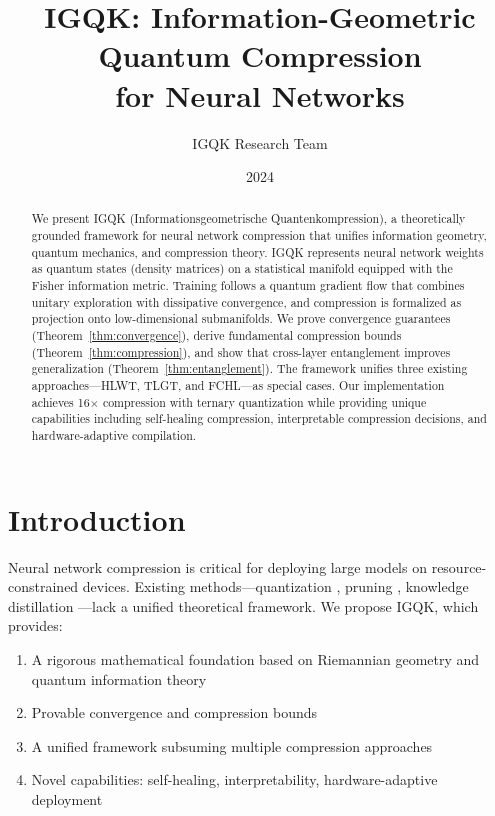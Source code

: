 \documentclass[11pt,a4paper]{article}
\title{IGQK: Information-Geometric Quantum Compression\\for Neural Networks}
\author{IGQK Research Team}
\date{2024}
\begin{document}
\maketitle

\begin{abstract}
We present IGQK (Informationsgeometrische Quantenkompression), a theoretically grounded framework for neural network compression that unifies information geometry, quantum mechanics, and compression theory. IGQK represents neural network weights as quantum states (density matrices) on a statistical manifold equipped with the Fisher information metric. Training follows a quantum gradient flow that combines unitary exploration with dissipative convergence, and compression is formalized as projection onto low-dimensional submanifolds. We prove convergence guarantees (Theorem~\ref{thm:convergence}), derive fundamental compression bounds (Theorem~\ref{thm:compression}), and show that cross-layer entanglement improves generalization (Theorem~\ref{thm:entanglement}). The framework unifies three existing approaches---HLWT, TLGT, and FCHL---as special cases. Our implementation achieves 16$\times$ compression with ternary quantization while providing unique capabilities including self-healing compression, interpretable compression decisions, and hardware-adaptive compilation.
\end{abstract}

\section{Introduction}

Neural network compression is critical for deploying large models on resource-constrained devices. Existing methods---quantization \citep{jacob2018quantization}, pruning \citep{han2015learning}, knowledge distillation \citep{hinton2015distilling}---lack a unified theoretical framework. We propose IGQK, which provides:

\begin{enumerate}
    \item A rigorous mathematical foundation based on Riemannian geometry and quantum information theory
    \item Provable convergence and compression bounds
    \item A unified framework subsuming multiple compression approaches
    \item Novel capabilities: self-healing, interpretability, hardware-adaptive deployment
\end{enumerate}
\end{document}
